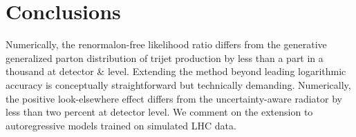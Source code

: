 \section{Conclusions}\label{sec:conclusions}

Numerically, the renormalon-free likelihood ratio differs from the
generative generalized parton distribution of trijet production by less
than a part in a thousand at detector & level. Extending the method beyond
leading logarithmic accuracy is conceptually straightforward but
technically demanding. Numerically, the positive look-elsewhere effect
differs from the uncertainty-aware radiator by less than two percent at
detector level. We comment on the extension to autoregressive models
trained on simulated LHC data.

